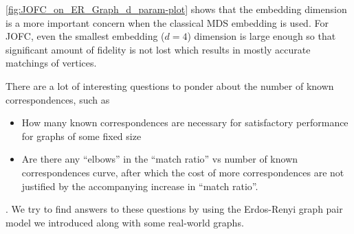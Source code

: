 \documentclass[12pt,oneside,final]{thesis}
\begin{document}
\autoref{fig:JOFC_on_ER_Graph_d_param-plot} shows that the embedding dimension is a more important concern when the classical MDS embedding is used. For JOFC, even the smallest embedding ($d=4$) dimension is large enough so that significant amount of fidelity  is not  lost which results in mostly accurate matchings of vertices.



There are a lot  of interesting questions to ponder about the number of known correspondences, such as 
\begin{itemize}
\item How many known correspondences are necessary for satisfactory performance for graphs of some fixed size 
\item Are there  any ``elbows'' in the ``match ratio'' vs number of known correspondences curve,  after which the cost of more correspondences are not justified by the accompanying increase in ``match ratio''.
\end{itemize}.
We try to find answers to these questions by using the Erdos-Renyi graph pair model we introduced along with some real-world graphs.
\end{document}
